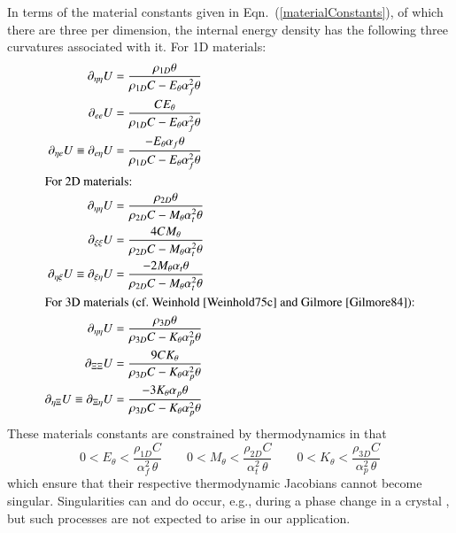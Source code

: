 In terms of the material constants given in Eqn.~(\ref{materialConstants}), of which there are three per dimension, the internal energy density has the following three curvatures associated with it.  For 1D materials:
\begin{subequations}
    \label{internalEnergies}
    \begin{align}
    \partial_{\eta\eta} U & = 
    \frac{\rho_{1D}\theta}{\rho_{1D} C - E_{\theta} \alpha_f^2 \theta } \\
    \partial_{ee} U & = \frac{C E_{\theta}}
    {\rho_{1D} C - E_{\theta} \alpha_f^2 \theta} \\
    \partial_{\eta e} U \equiv \partial_{e \eta} U & = 
    \frac{-E_{\theta} \alpha_f \theta}{\rho_{1D} C - E_{\theta} \alpha_f^2 \theta} \\
    \intertext{For 2D materials:}
    \partial_{\eta\eta} U & = 
    \frac{\rho_{2D} \theta}{\rho_{2D} C - M_{\theta} \alpha_t^2 \theta} \\
    \partial_{\xi\xi} U & = \frac{4 C M_{\theta}}
    {\rho_{2D} C - M_{\theta} \alpha_t^2 \theta} \\
    \partial_{\eta \xi} U \equiv \partial_{\xi \eta} U & = 
    \frac{-2M_{\theta} \alpha_t \theta}
    {\rho_{2D} C - M_{\theta} \alpha_t^2 \theta} \\
    \intertext{For 3D materials (cf.\ Weinhold \cite{Weinhold75c} and Gilmore \cite{Gilmore84}):}
    \partial_{\eta\eta} U & = 
    \frac{\rho_{3D} \theta}{\rho_{3D} C - K_{\theta} \alpha_p^2 \theta} \\
    \partial_{\Xi\Xi} U & = \frac{9 C K_{\theta}}
    {\rho_{3D} C - K_{\theta} \alpha_p^2 \theta} \\
    \partial_{\eta\Xi} U \equiv 
    \partial_{\Xi\eta} U & = 
    \frac{-3K_{\theta} \alpha_p \theta}{\rho_{3D} C - K_{\theta} \alpha_p^2 \theta}
    \end{align}
\end{subequations}
These materials constants are constrained by thermo\-dynamics in that
\begin{equation}
    \label{thermodynamicConstraints}
    0 < E_{\theta} < \frac{\rho_{1D} C}{\alpha_f^2 \, \theta} \qquad
    0 < M_{\theta} < \frac{\rho_{2D} C}{\alpha_t^2 \, \theta} \qquad
    0 < K_{\theta} < \frac{\rho_{3D} C}{\alpha_p^2 \, \theta}
\end{equation} 
which ensure that their respective thermo\-dynamic Jacobians cannot become singular. Singularities can and do occur, e.g., during a phase change in a crystal \cite{McLellan76,Gilmore84}, but such processes are not expected to arise in our application.

